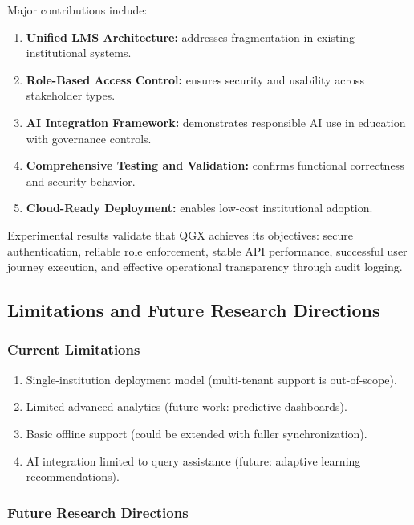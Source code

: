 \documentclass[11pt,a4paper]{article}
\begin{document}
Major contributions include:

\begin{enumerate}
    \item \textbf{Unified LMS Architecture:} addresses fragmentation in existing institutional systems.
    \item \textbf{Role-Based Access Control:} ensures security and usability across stakeholder types.
    \item \textbf{AI Integration Framework:} demonstrates responsible AI use in education with governance controls.
    \item \textbf{Comprehensive Testing and Validation:} confirms functional correctness and security behavior.
    \item \textbf{Cloud-Ready Deployment:} enables low-cost institutional adoption.
\end{enumerate}

Experimental results validate that QGX achieves its objectives: secure authentication, reliable role enforcement, stable API performance, successful user journey execution, and effective operational transparency through audit logging.

\subsection{Limitations and Future Research Directions}

\subsubsection{Current Limitations}

\begin{enumerate}
    \item Single-institution deployment model (multi-tenant support is out-of-scope).
    \item Limited advanced analytics (future work: predictive dashboards).
    \item Basic offline support (could be extended with fuller synchronization).
    \item AI integration limited to query assistance (future: adaptive learning recommendations).
\end{enumerate}

\subsubsection{Future Research Directions}
\end{document}
